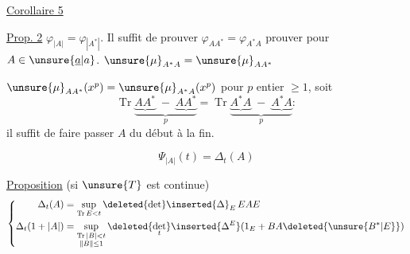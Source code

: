 \uline{Corollaire 5}  

\uline{Prop. 2} $\varphi_{|A|}=\varphi_{|A^*|}$.
Il suffit de  prouver  $\varphi_{AA^*}=\varphi_{A^*A}$
 prouver pour $A\in\unsure{\underline a|a}$.
$\unsure{\mu}_{A^*A}=\unsure{\mu}_{AA^*}$

$\unsure{\mu}_{AA^*}(x^p)=\unsure{\mu}_{A^*A}(x^p)$ pour $p$ entier $\geq1$, soit
\[
\operatorname{Tr}\underbrace{\underbrace{AA^*}\; - \;\underbrace{AA^*}}_{p}
=\operatorname{Tr}\underbrace{\underbrace{A^*A}\; - \;\underbrace{A^*A}}_{p}:
\]
il suffit de faire passer $A$ du début à la fin.

\[
\Psi_{|A|}(t)=\Delta_t(A)
\]

\uline{Proposition} (si $\unsure{T}$ est continue)
\[
\left\{\begin{aligned}
\Delta_t(A)&=\sup_{\operatorname{Tr}E<t}\deleted{\det}\inserted{\Delta}_E\,EAE\\
\Delta_t(1+|A|)&=\sup_{\substack{\operatorname{Tr}|B|<t\\\|B\|\leq1}}
\deleted{\det_t}\inserted{\Delta^E}(1_E+BA\deleted{\unsure{B^*|E}})
\end{aligned}\right.
\]

